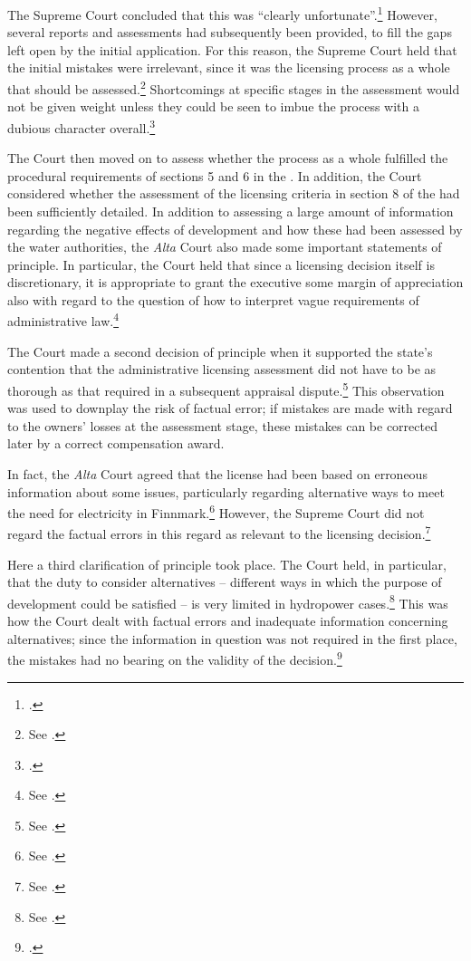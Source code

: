 The Supreme Court concluded that this was ``clearly unfortunate''.\footcite[265]{alta82} However, several reports and assessments had subsequently been provided, to fill the gaps left open by the initial application. For this reason, the Supreme Court held that the initial mistakes were irrelevant, since it was the licensing process as a whole that should be assessed.\footnote{See \cite[265-266]{alta82}.} Shortcomings at specific stages in the assessment would not be given weight unless they could be seen to imbue the process with a dubious character overall.\footcite[265]{alta82}

The Court then moved on to assess whether the process as a whole fulfilled the procedural requirements of sections 5 and 6 in the \cite{wra17}. In addition, the Court considered whether the assessment of the licensing criteria in section 8 of the \cite{wra17} had been sufficiently detailed. In addition to assessing a large amount of information regarding the negative effects of development and how these had been assessed by the water authorities, the {\it Alta} Court also made some important statements of principle. In particular, the Court held that since a licensing decision itself is discretionary, it is appropriate to grant the executive some margin of appreciation also with regard to the question of how to interpret vague requirements of administrative law.\footnote{See \cite[262-264]{alta82}.}

The Court made a second decision of principle when it supported the state's contention that the administrative licensing assessment did not have to be as thorough as that required in a subsequent appraisal dispute.\footnote{See \cite[279|330]{alta82}.} This observation was used to downplay the risk of factual error; if mistakes are made with regard to the owners' losses at the assessment stage, these mistakes can be corrected later by a correct compensation award.

In fact, the {\it Alta} Court agreed that the license had been based on erroneous information about some issues, particularly regarding alternative ways to meet the need for electricity in Finnmark.\footnote{See \cite[346-357]{alta82}.} However, the Supreme Court did not regard the factual errors in this regard as relevant to the licensing decision.\footnote{See \cite[346]{alta82}.} 

Here a third clarification of principle took place. The Court held, in particular, that the duty to consider alternatives -- different ways in which the purpose of development could be satisfied -- is very limited in hydropower cases.\footnote{See \cite[346]{alta82}.} This was how the Court dealt with  factual errors and inadequate information concerning alternatives; since the information in question was not required in the first place, the mistakes had no bearing on the validity of the decision.\footcite[346]{alta82}

